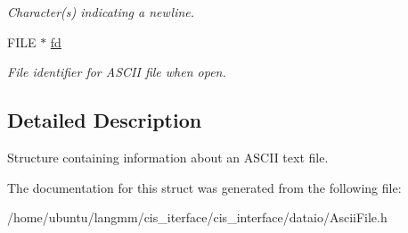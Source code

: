 \begin{DoxyCompactItemize}
\begin{DoxyCompactList}\small\item\em Character(s) indicating a newline. \end{DoxyCompactList}\item 
\mbox{\label{structasciiFile__t_a799e768ea6b00c3cdf49303950b015b6}} 
F\+I\+LE $\ast$ \hyperlink{structasciiFile__t_a799e768ea6b00c3cdf49303950b015b6}{fd}
\begin{DoxyCompactList}\small\item\em File identifier for A\+S\+C\+II file when open. \end{DoxyCompactList}\end{DoxyCompactItemize}


\subsection{Detailed Description}
Structure containing information about an A\+S\+C\+II text file. 

The documentation for this struct was generated from the following file\+:\begin{DoxyCompactItemize}
\item 
/home/ubuntu/langmm/cis\+\_\+iterface/cis\+\_\+interface/dataio/Ascii\+File.\+h\end{DoxyCompactItemize}
